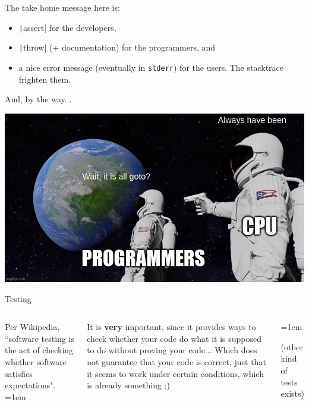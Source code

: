\documentclass[10pt,
aspectratio=169
]{beamer}
\begin{document}
\begin{frame}
The take home message here is:\begin{itemize}
	\item \texttt|assert| for the developers,
	\item \texttt|throw| (+ documentation) for the programmers, and
	\item a nice error message (eventually in \texttt{stderr}) for the users. The stacktrace frighten them.
\end{itemize}


And, by the way...

\begin{center}
	\includegraphics[width=.5\linewidth]{im/meme-goto}
\end{center}
\end{frame}

\begin{frame}{Testing}
	\begin{columns}
		
		Per Wikipedia, ``software testing is the act of checking whether software satisfies expectations". 
		\parskip=1em
		
		It is \textbf{very} important, since it provides ways to check whether your code do what it is supposed to do without proving your code... Which does not guarantee that your code is correct, just that it seems to work under certain conditions, which is already something ;)
		
	
	\begin{center}
		\parskip=1em
		
		(other kind of tests exists)
	\end{center}
\end{columns}
\end{frame}
\end{document}
